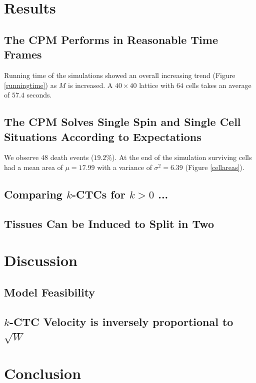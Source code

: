 \documentclass[12pt]{article}
\begin{document}
\section{Results}
\subsection{The CPM Performs in Reasonable Time Frames}
Running time of the simulations showed an overall increasing trend (Figure \ref{runningtime}) as $M$ is increased. A $40\times40$ lattice with $64$ cells takes an average of $57.4$ seconds. 

\subsection{The CPM Solves Single Spin and Single Cell Situations According to Expectations }
We observe 48 death events ($19.2\%$). At the end of the simulation surviving cells had a mean area of $\mu = 17.99$ with a variance of $\sigma^2 = 6.39$ (Figure \ref{cellareas}). %

\subsection{Comparing $k$-CTCs for $k>0$ ...} %

\subsection{Tissues Can be Induced to Split in Two}

\section{Discussion}

\subsection{Model Feasibility}

\subsection{$k$-CTC Velocity is inversely proportional to $\sqrt{W}$ }

\section{Conclusion}
\end{document}
